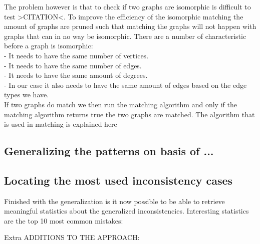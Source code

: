 \documentclass{article}
\begin{document}
The problem however is that to check if two graphs are isomorphic is difficult to test >CITATION<. 
To improve the efficiency of the isomorphic matching the amount of graphs are pruned such that matching the graphs will not happen with graphs that can in no way be isomorphic. There are a number of characteristic before a graph is isomorphic:\\
 - It needs to have the same number of vertices.\\
 - It needs to have the same number of edges.\\
 - It needs to have the same amount of degrees.\\
 - In our case it also needs to have the same amount of edges based on the edge types we have.\\
 
If two graphs do match we then run the matching algorithm and only if the matching algorithm returns true the two graphs are matched.
The algorithm that is used in matching is explained here %


\subsection{Generalizing the patterns on basis of ...}


\subsection{Locating the most used inconsistency cases}
Finished with the generalization is it now possible to be able to retrieve meaningful statistics about the generalized inconsistencies. Interesting statistics are the top 10 most common mistakes:


Extra ADDITIONS TO THE APPROACH:
\end{document}
